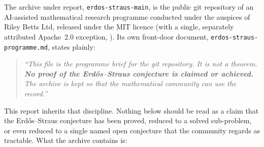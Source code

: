 \documentclass[11pt]{article}
\theoremstyle{plain}
\theoremstyle{definition}
\theoremstyle{remark}
\newcommand{\file}[1]{\texttt{#1}}
\renewcommand{\_}{\textunderscore\allowbreak}
\begin{document}
The archive under report, \file{erdos-straus-main}, is the public git repository of an
AI-assisted mathematical research programme conducted under the auspices of Riley Betts Ltd,
released under the MIT licence (with a single, separately attributed Apache~2.0 exception,
). Its own front-door document,
\texttt{erdos-\allowbreak straus-\allowbreak programme.md}, states plainly:
\begin{quote}
\small\itshape
``This file is the programme brief for the git repository. It is not a theorem. \textbf{No proof
of the Erd\H{o}s--Straus conjecture is claimed or achieved.} The archive is kept so that the
mathematical community can use the record.''
\end{quote}
This report inherits that discipline. Nothing below should be read as a claim that the
Erd\H{o}s--Straus conjecture has been proved, reduced to a solved sub-problem, or even reduced to
a single named open conjecture that the community regards as tractable. What the archive
contains is:
\end{document}
